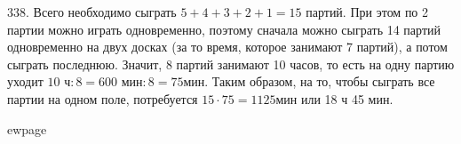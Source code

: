 338. Всего необходимо сыграть $5+4+3+2+1=15$ партий. При этом по 2 партии можно играть одновременно, поэтому сначала можно сыграть 14 партий одновременно на двух досках (за то время, которое занимают 7 партий), а потом сыграть последнюю. Значит, 8 партий занимают 10 часов, то есть на одну партию уходит $10\text{ ч}:8= 600\text{ мин}:8=75$мин. Таким образом, на то, чтобы сыграть все партии на одном поле, потребуется $15\cdot75=1125$мин или 18 ч 45 мин.

ewpage
